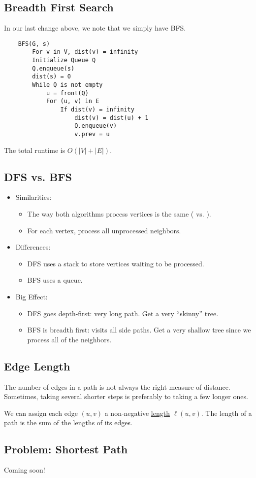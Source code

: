 \documentclass[letterpaper]{article}
\begin{document}
\subsection{Breadth First Search}
In our last change above, we note that we simply have BFS.
\begin{verbatim}
    BFS(G, s)
        For v in V, dist(v) = infinity 
        Initialize Queue Q
        Q.enqueue(s)
        dist(s) = 0
        While Q is not empty
            u = front(Q)
            For (u, v) in E
                If dist(v) = infinity
                    dist(v) = dist(u) + 1
                    Q.enqueue(v)
                    v.prev = u
\end{verbatim}
The total runtime is $O(|V| + |E|)$.

\subsection{DFS vs. BFS}
\begin{itemize}
    \item Similarities:
    \begin{itemize}
        \item The way both algorithms process vertices is the same ( vs. ).
        \item For each vertex, process all unprocessed neighbors.
    \end{itemize}
    \item Differences:
    \begin{itemize}
        \item DFS uses a stack to store vertices waiting to be processed. 
        \item BFS uses a queue.
    \end{itemize}
    \item Big Effect:
    \begin{itemize}
        \item DFS goes depth-first: very long path. Get a very ``skinny'' tree. 
        \item BFS is breadth first: visits all side paths. Get a very shallow tree since we process all of the neighbors.
    \end{itemize}
\end{itemize}

\subsection{Edge Length}
The number of edges in a path is not always the right measure of distance. Sometimes, taking several shorter steps is preferably to taking a few longer ones. 

\bigskip 

We can assign each edge $(u, v)$ a non-negative \underline{length} $\ell(u, v)$. The length of a path is the sum of the lengths of its edges.

\subsection{Problem: Shortest Path}
Coming soon!
\end{document}
